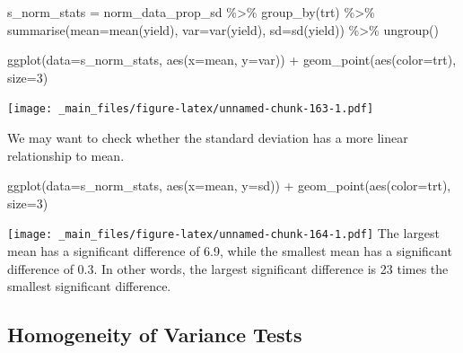 \documentclass[
]{book}
\newenvironment{Shaded}{\begin{snugshade}}{\end{snugshade}}
\newcommand{\AttributeTok}[1]{\textcolor[rgb]{0.77,0.63,0.00}{#1}}
\newcommand{\DecValTok}[1]{\textcolor[rgb]{0.00,0.00,0.81}{#1}}
\newcommand{\FunctionTok}[1]{\textcolor[rgb]{0.00,0.00,0.00}{#1}}
\newcommand{\NormalTok}[1]{#1}
\newcommand{\OtherTok}[1]{\textcolor[rgb]{0.56,0.35,0.01}{#1}}
\newcommand{\SpecialCharTok}[1]{\textcolor[rgb]{0.00,0.00,0.00}{#1}}
\begin{document}
\begin{Shaded}
\begin{Highlighting}[]
\NormalTok{s\_norm\_stats }\OtherTok{=}\NormalTok{ norm\_data\_prop\_sd }\SpecialCharTok{\%\textgreater{}\%}
        \FunctionTok{group\_by}\NormalTok{(trt) }\SpecialCharTok{\%\textgreater{}\%}
        \FunctionTok{summarise}\NormalTok{(}\AttributeTok{mean=}\FunctionTok{mean}\NormalTok{(yield),}
                \AttributeTok{var=}\FunctionTok{var}\NormalTok{(yield),}
                \AttributeTok{sd=}\FunctionTok{sd}\NormalTok{(yield)) }\SpecialCharTok{\%\textgreater{}\%}
        \FunctionTok{ungroup}\NormalTok{()}


\FunctionTok{ggplot}\NormalTok{(}\AttributeTok{data=}\NormalTok{s\_norm\_stats, }\FunctionTok{aes}\NormalTok{(}\AttributeTok{x=}\NormalTok{mean, }\AttributeTok{y=}\NormalTok{var)) }\SpecialCharTok{+}
        \FunctionTok{geom\_point}\NormalTok{(}\FunctionTok{aes}\NormalTok{(}\AttributeTok{color=}\NormalTok{trt), }\AttributeTok{size=}\DecValTok{3}\NormalTok{)}
\end{Highlighting}
\end{Shaded}

\texttt{[image: \_main\_files/figure-latex/unnamed-chunk-163-1.pdf]}

We may want to check whether the standard deviation has a more linear relationship to mean.

\begin{Shaded}
\begin{Highlighting}[]
\FunctionTok{ggplot}\NormalTok{(}\AttributeTok{data=}\NormalTok{s\_norm\_stats, }\FunctionTok{aes}\NormalTok{(}\AttributeTok{x=}\NormalTok{mean, }\AttributeTok{y=}\NormalTok{sd)) }\SpecialCharTok{+}
        \FunctionTok{geom\_point}\NormalTok{(}\FunctionTok{aes}\NormalTok{(}\AttributeTok{color=}\NormalTok{trt), }\AttributeTok{size=}\DecValTok{3}\NormalTok{)}
\end{Highlighting}
\end{Shaded}

\texttt{[image: \_main\_files/figure-latex/unnamed-chunk-164-1.pdf]}
The largest mean has a significant difference of 6.9, while the smallest mean has a significant difference of 0.3. In other words, the largest significant difference is 23 times the smallest significant difference.

\hypertarget{homogeneity-of-variance-tests}{%
\subsection{Homogeneity of Variance Tests}\label{homogeneity-of-variance-tests}}
\end{document}
